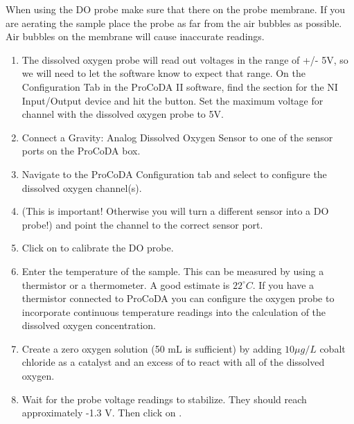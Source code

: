 \documentclass[letterpaper,10pt,english]{sphinxmanual}
\begin{document}
When using the DO probe make sure that there  on the probe membrane. If you are aerating the sample place the probe as far from the air bubbles as possible. Air bubbles on the membrane will cause inaccurate readings.
\begin{enumerate}
\item {} 
The dissolved oxygen probe will read out voltages in the range of +/- 5V, so we will need to let the software know to expect that range. On the Configuration Tab in the ProCoDA II software, find the section for the NI Input/Output device and hit the  button. Set the maximum voltage for channel with the dissolved oxygen probe to 5V.

\item {} 
Connect a Gravity: Analog Dissolved Oxygen Sensor to one of the sensor ports on the ProCoDA box.

\item {} 
Navigate to the ProCoDA Configuration tab and select  to configure the dissolved oxygen channel(s).

\item {} 
 (This is important! Otherwise you will turn a different sensor into a DO probe!) and point the channel to the correct sensor port.

\item {} 
Click on  to calibrate the DO probe.

\item {} 
Enter the temperature of the sample. This can be measured by using a thermistor or a thermometer. A good estimate is \(22^\circ C\). If you have a thermistor connected to ProCoDA you can configure the oxygen probe to incorporate continuous temperature readings into the calculation of the dissolved oxygen concentration.

\item {} 
Create a zero oxygen solution (50 mL is sufficient) by adding \(10 \mu g/L\) cobalt chloride as a catalyst and an excess of {\hyperref[\detokenize{Gas_Transfer/Gas_Transfer:heading-gas-transfer-deoxygenation}]{}} to react with all of the dissolved oxygen.

\item {} 
Wait for the probe voltage readings to stabilize. They should reach approximately -1.3 V.  Then click on .


\end{enumerate}
\end{document}
